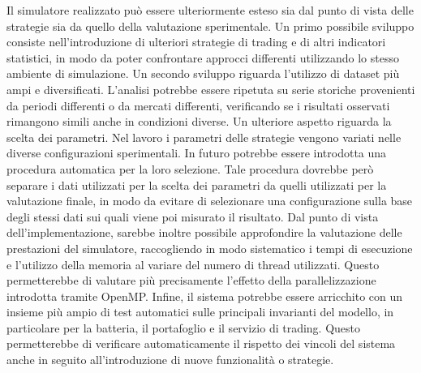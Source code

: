 \documentclass[12pt,a4paper,oneside]{report}
\begin{document}
Il simulatore realizzato può essere ulteriormente esteso sia dal punto di vista delle
strategie sia da quello della valutazione sperimentale.
Un primo possibile sviluppo consiste nell'introduzione di ulteriori strategie di trading
e di altri indicatori statistici, in modo da poter confrontare approcci differenti
utilizzando lo stesso ambiente di simulazione.
Un secondo sviluppo riguarda l'utilizzo di dataset più ampi e diversificati. L'analisi
potrebbe essere ripetuta su serie storiche provenienti da periodi differenti o da mercati
differenti, verificando se i risultati osservati rimangono simili anche in condizioni diverse.
Un ulteriore aspetto riguarda la scelta dei parametri. Nel lavoro i parametri delle strategie
vengono variati nelle diverse configurazioni sperimentali. In futuro potrebbe essere introdotta
una procedura automatica per la loro selezione. Tale procedura dovrebbe però separare i dati
utilizzati per la scelta dei parametri da quelli utilizzati per la valutazione finale, in modo
da evitare di selezionare una configurazione sulla base degli stessi dati sui quali viene poi
misurato il risultato.
Dal punto di vista dell'implementazione, sarebbe inoltre possibile approfondire la valutazione
delle prestazioni del simulatore, raccogliendo in modo sistematico i tempi di esecuzione e
l'utilizzo della memoria al variare del numero di thread utilizzati. Questo permetterebbe di valutare
più precisamente l'effetto della parallelizzazione introdotta tramite OpenMP.
Infine, il sistema potrebbe essere arricchito con un insieme più ampio di test automatici sulle
principali invarianti del modello, in particolare per la batteria, il portafoglio e il servizio
di trading. Questo permetterebbe di verificare automaticamente il rispetto dei vincoli del sistema
anche in seguito all'introduzione di nuove funzionalità o strategie.



\nocite{*}
\end{document}
